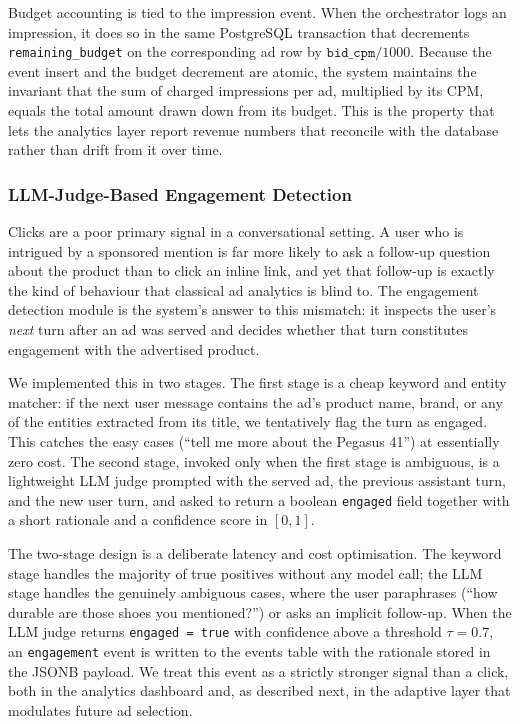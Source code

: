 Budget accounting is tied to the impression event. When the orchestrator
logs an impression, it does so in the same PostgreSQL transaction that
decrements \texttt{remaining\_budget} on the corresponding ad row by
$\texttt{bid\_cpm}/1000$. Because the event insert and the budget decrement
are atomic, the system maintains the invariant that the sum of charged
impressions per ad, multiplied by its CPM, equals the total amount drawn
down from its budget. This is the property that lets the analytics layer
report revenue numbers that reconcile with the database rather than drift
from it over time.

\subsubsection{LLM-Judge-Based Engagement Detection}
\label{subsubsec:llm-judge-engagement}

Clicks are a poor primary signal in a conversational setting. A user who is
intrigued by a sponsored mention is far more likely to ask a follow-up
question about the product than to click an inline link, and yet that
follow-up is exactly the kind of behaviour that classical ad analytics is
blind to. The engagement detection module is the system's answer to this
mismatch: it inspects the user's \emph{next} turn after an ad was served and
decides whether that turn constitutes engagement with the advertised product.

We implemented this in two stages. The first stage is a cheap keyword and
entity matcher: if the next user message contains the ad's product name,
brand, or any of the entities extracted from its title, we tentatively flag
the turn as engaged. This catches the easy cases (``tell me more about the
Pegasus 41'') at essentially zero cost. The second stage, invoked only when
the first stage is ambiguous, is a lightweight LLM judge prompted with the served ad,
the previous assistant turn, and the new user turn, and asked to return a
boolean \texttt{engaged} field together with a short rationale and a
confidence score in $[0,1]$.

The two-stage design is a deliberate latency and cost optimisation. The
keyword stage handles the majority of true positives without any model call;
the LLM stage handles the genuinely ambiguous cases, where the user
paraphrases (``how durable are those shoes you mentioned?'') or asks an
implicit follow-up. When the LLM judge returns \texttt{engaged = true} with
confidence above a threshold $\tau = 0.7$, an \texttt{engagement} event is
written to the events table with the rationale stored in the JSONB payload.
We treat this event as a strictly stronger signal than a click, both in the
analytics dashboard and, as described next, in the adaptive layer that
modulates future ad selection.

